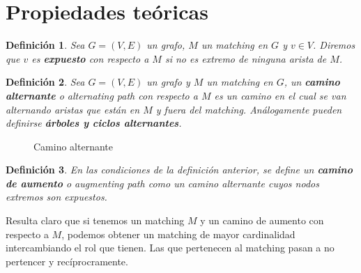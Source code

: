 \documentclass[twoside,a4paper,openright,12pt,tikz]{book}
\newtheorem{defi}{Definici\'on}[section]
\begin{document}
\section{Propiedades teóricas}
\begin{defi}
Sea $G=(V,E)$ un grafo, $M$ un matching en $G$ y $v\in V$. Diremos que $v$ es \textbf{expuesto} con respecto a $M$ si no es extremo de ninguna arista de $M$.
\end{defi}
\begin{defi}
Sea $G=(V,E)$ un grafo y $M$ un matching en $G$, un \textbf{camino alternante} o \textit{alternating path} con respecto a $M$ es un camino en el cual se van alternando aristas que están en $M$ y fuera del matching. Análogamente pueden definirse \textbf{árboles y ciclos alternantes}.
\end{defi}
\begin{figure}[h!]
\centering
{}
\caption{Camino alternante}
\end{figure}

\begin{defi}
En las condiciones de la definición anterior, se define un \textbf{camino de aumento} o \textit{augmenting path} como un camino alternante cuyos nodos extremos son expuestos.
\end{defi}
Resulta claro que si tenemos un matching $M$ y un camino de aumento con respecto a $M$, podemos obtener un matching de mayor cardinalidad intercambiando el rol que tienen. Las que pertenecen al matching pasan a no pertencer y recíprocramente.
\end{document}
